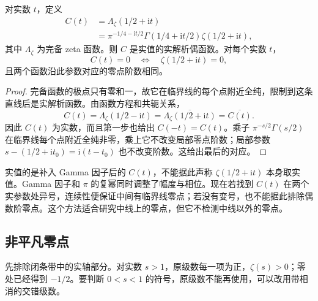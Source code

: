 \begin{proposition}[临界线上的实值函数]\label{b3:prop:26-critical-line-real}
对实数 \(t\)，定义
\[
 \begin{aligned}
 C(t)&=\Lambda_\zeta(1/2+\mathrm it)\\
 &=\pi^{-1/4-\mathrm it/2}
   \Gamma(1/4+\mathrm it/2)\zeta(1/2+\mathrm it),
 \end{aligned}
\]
其中 \(\Lambda_\zeta\) 为完备 zeta 函数。则 \(C\) 是实值的实解析偶函数。对每个实数 \(t\)，
\[
 C(t)=0\quad\Longleftrightarrow\quad
 \zeta(1/2+\mathrm it)=0,
\]
且两个函数沿此参数对应的零点阶数相同。
\end{proposition}
\begin{proof}
完备函数的极点只有零和一，故它在临界线的每个点附近全纯，限制到这条直线后是实解析函数。由函数方程和共轭关系，
\[
 C(t)=\Lambda_\zeta(1/2-\mathrm it)
     =\overline{\Lambda_\zeta(1/2+\mathrm it)}
     =\overline{C(t)}.
\]
因此 \(C(t)\) 为实数，而且第一步也给出 \(C(-t)=C(t)\)。乘子 \(\pi^{-s/2}\Gamma(s/2)\) 在临界线每个点附近全纯非零，乘上它不改变局部零点阶数；局部参数 \(s-(1/2+\mathrm it_0)=\mathrm i(t-t_0)\) 也不改变阶数。这给出最后的对应。
\end{proof}

实值的是补入 Gamma 因子后的 \(C(t)\)，不能据此声称 \(\zeta(1/2+\mathrm it)\) 本身取实值。Gamma 因子和 \(\pi\) 的复幂同时调整了幅度与相位。现在若找到 \(C(t)\) 在两个实参数处异号，连续性便保证中间有临界线零点；若没有变号，也不能据此排除偶数阶零点。这个方法适合研究中线上的零点，但它不检测中线以外的零点。

\subsection{非平凡零点}
\label{b3:subsec:260504}

先排除闭条带中的实轴部分。对实数 \(s>1\)，原级数每一项为正，\(\zeta(s)>0\)；零处已经得到 \(-1/2\)。要判断 \(0<s<1\) 的符号，原级数不能再使用，可以改用带相消的交错级数。

